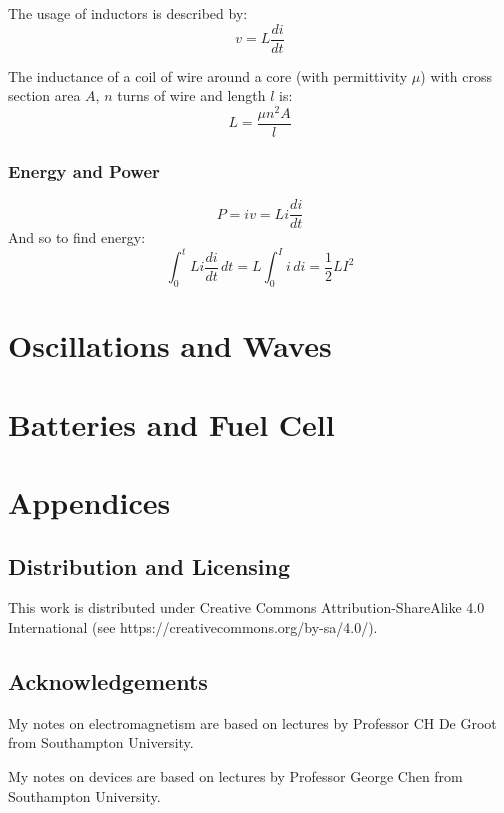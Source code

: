 \documentclass[11pt,a4paper]{report}
\begin{document}
The usage of inductors is described by:
\begin{equation*}
	v = L\frac{di}{dt}
\end{equation*}

The inductance of a coil of wire around a core (with permittivity $\mu$) with cross section area $A$, $n$ turns of wire and length $l$ is:
\begin{equation*}
	L = \frac{\mu n^2A}{l}
\end{equation*}

\subsection{Energy and Power}
\begin{equation*}
	P = iv = Li\frac{di}{dt}
\end{equation*}
And so to find energy:
\begin{equation*}
	\int_0^t Li\frac{di}{dt} \, dt = L\int_0^I i \, di = \frac{1}{2}LI^2
\end{equation*}


\chapter{Oscillations and Waves}

\chapter{Batteries and Fuel Cell}

\chapter{Appendices}
\section{Distribution and Licensing}
This work is distributed under Creative Commons Attribution-ShareAlike 4.0
International (see https://creativecommons.org/by-sa/4.0/).

\section{Acknowledgements}
My notes on electromagnetism are based on lectures by Professor CH De Groot from Southampton University.

My notes on devices are based on lectures by Professor George Chen from Southampton University.
\end{document}
